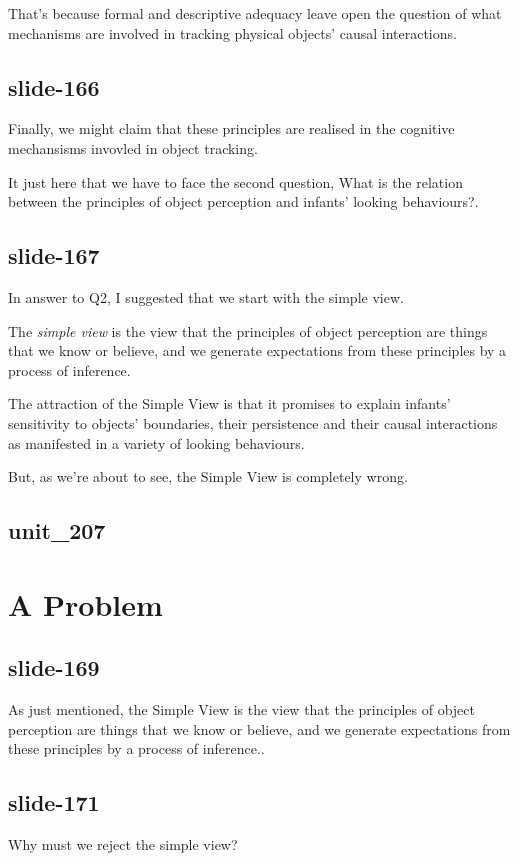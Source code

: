 \documentclass[12pt,\papersize]{extarticle}
\begin{document}
That's because formal and descriptive adequacy leave open the question of what mechanisms are involved in tracking physical objects' causal interactions.
 
\subsection{slide-166}
Finally, we might claim that these principles are realised in the cognitive mechansisms invovled in object tracking.
 
It just here that we have to face the second question, What is the relation between the principles of object perception and infants’ looking behaviours?.
 
\subsection{slide-167}
In answer to Q2, I suggested that we start with the simple view.
 
The \emph{simple view} is the view that the principles of object perception are things that we know or believe, and we generate expectations from these principles by a process of inference.
 
The attraction of the Simple View is that it promises to explain infants' sensitivity to objects' boundaries, their persistence and their causal interactions as manifested in a variety of looking behaviours.
 
But, as we're about to see, the Simple View is completely wrong.
 
\subsection{unit\_207}
 
 
\section{A Problem}
 
\subsection{slide-169}
As just mentioned, the Simple View is the view that the principles of object perception are things that we know or believe, and we generate expectations from these principles by a process of inference..
 
\subsection{slide-171}
Why must we reject the simple view?
 
\end{document}
